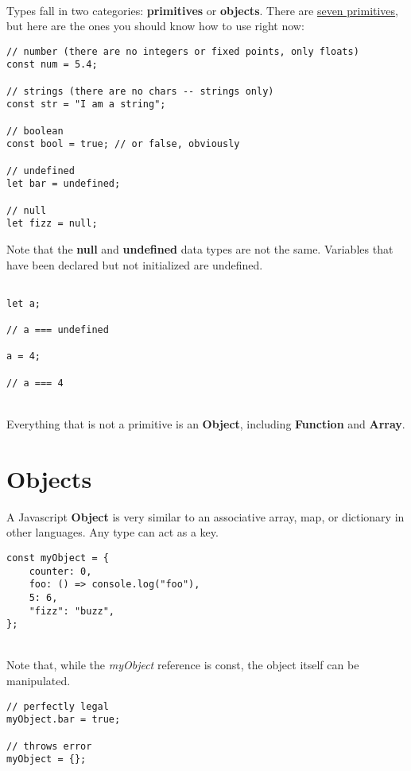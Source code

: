 \documentclass{article}
\begin{document}
\noindent
\\
Types fall in two categories: \textbf{primitives} or \textbf{objects}. There are \href{https://developer.mozilla.org/en-US/docs/Web/JavaScript/Language_overview#data_types}{seven primitives}, but here are the ones you should know how to use right now:
\begin{lstlisting}
// number (there are no integers or fixed points, only floats)
const num = 5.4;

// strings (there are no chars -- strings only)
const str = "I am a string";

// boolean
const bool = true; // or false, obviously

// undefined
let bar = undefined;

// null
let fizz = null;
\end{lstlisting}

\noindent
Note that the \textbf{null} and \textbf{undefined} data types are not the same. Variables that have been declared but not initialized are undefined.

\begin{lstlisting}

let a;

// a === undefined

a = 4;

// a === 4

\end{lstlisting}

\noindent
\\
Everything that is not a primitive is an \textbf{Object}, including \textbf{Function} and \textbf{Array}.

\section{Objects}

A Javascript \textbf{Object} is very similar to an associative array, map, or dictionary in other languages. Any type can act as a key.

\begin{lstlisting}
const myObject = {
	counter: 0,
	foo: () => console.log("foo"),
	5: 6,
	"fizz": "buzz",
};
\end{lstlisting}

\noindent
\\
Note that, while the \textit{myObject} reference is const, the object itself can be manipulated.

\begin{lstlisting}
// perfectly legal
myObject.bar = true;

// throws error
myObject = {};
\end{lstlisting}
\end{document}
